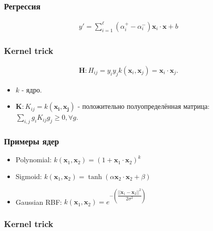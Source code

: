 \documentclass[14pt]{beamer}
\begin{document}
\begin{frame}
\frametitle{Регрессия}
\begin{align*}
  y' = \sum\limits_{i = 1}^{\ell}(\alpha_i^+ - \alpha_i^-)\mathbf{x}_i\cdot\mathbf{x} + b
\end{align*}
\end{frame}

\begin{frame}
\frametitle{Kernel trick}
\begin{align*}
  \mathbf{H}: H_{ij} = y_iy_jk(\mathbf{x}_i, \mathbf{x}_j) = \mathbf{x}_i \cdot \mathbf{x}_j.
\end{align*}
\begin{itemize}
  \item<2-> $k$ - ядро.
  \item<3-> $\mathbf{K}: K_{ij} = k(\mathbf{x_i}, \mathbf{x_j})$ - положительно
  полуопределённая матрица: $\sum\limits_{i,j}g_iK_{ij}g_j \geqslant 0, \forall g$.
\end{itemize}
\end{frame}

\begin{frame}
\frametitle{Примеры ядер}
\begin{itemize}
  \item Polynomial: $k(\mathbf{x}_1, \mathbf{x}_2) = (1 + \mathbf{x}_1\cdot \mathbf{x}_2)^k$
  \item Sigmoid: $k(\mathbf{x}_1, \mathbf{x}_2) = \tanh(\alpha\mathbf{x}_2\cdot \mathbf{x}_2 + \beta)$
  \item Gaussian RBF: $k(\mathbf{x}_1, \mathbf{x}_2) = e^{-\left(\dfrac{||\mathbf{x}_1 - \mathbf{x}_2||^2}{2\sigma^2}\right)}$
\end{itemize}
\end{frame}

\begin{frame}
\frametitle{Kernel trick}
\end{frame}
\end{document}
